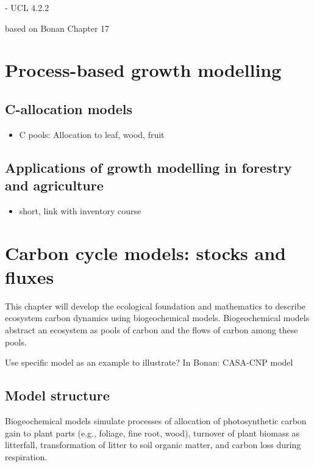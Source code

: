 \documentclass[12pt,oneside]{book}
\providecommand{\tightlist}{%
  \setlength{\itemsep}{0pt}\setlength{\parskip}{0pt}}
\begin{document}
 - UCL 4.2.2

based on Bonan Chapter 17

\section{Process-based growth
modelling}\label{process-based-growth-modelling}

\subsection{C-allocation models}\label{c-allocation-models}

\begin{itemize}
\tightlist
\item
  C pools: Allocation to leaf, wood, fruit
\end{itemize}

\subsection{Applications of growth modelling in forestry and
agriculture}\label{applications-of-growth-modelling-in-forestry-and-agriculture}

\begin{itemize}
\tightlist
\item
  short, link with inventory course
\end{itemize}

\section{Carbon cycle models: stocks and
fluxes}\label{carbon-cycle-models-stocks-and-fluxes}

This chapter will develop the ecological foundation and mathematics to
describe ecosystem carbon dynamics using biogeochemical models.
Biogeochemical models abstract an ecosystem as pools of carbon and the
flows of carbon among these pools.

Use specific model as an example to illustrate? In Bonan: CASA-CNP model

\subsection{Model structure}\label{model-structure}

Biogeochemical models simulate processes of allocation of photosynthetic
carbon gain to plant parts (e.g., foliage, fine root, wood), turnover of
plant biomass as litterfall, transformation of litter to soil organic
matter, and carbon loss during respiration.
\end{document}
